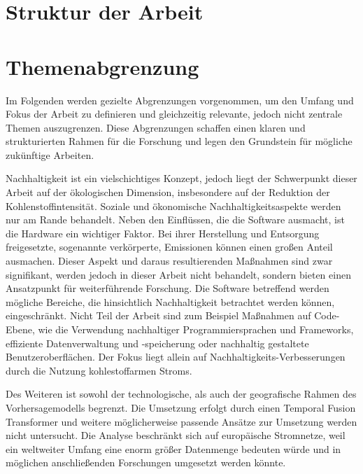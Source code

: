 \section{Struktur der Arbeit}
\section{Themenabgrenzung}
Im Folgenden werden gezielte Abgrenzungen vorgenommen, um den Umfang und Fokus der Arbeit zu definieren und gleichzeitig relevante, jedoch nicht zentrale Themen auszugrenzen.
Diese Abgrenzungen schaffen einen klaren und strukturierten Rahmen für die Forschung und legen den Grundstein für mögliche zukünftige Arbeiten.

Nachhaltigkeit ist ein vielschichtiges Konzept, jedoch liegt der Schwerpunkt dieser Arbeit auf der ökologischen Dimension, insbesondere auf der Reduktion der Kohlenstoffintensität.
Soziale und ökonomische Nachhaltigkeitsaspekte werden nur am Rande behandelt.
Neben den Einflüssen, die die Software ausmacht, ist die Hardware ein wichtiger Faktor.
Bei ihrer Herstellung und Entsorgung freigesetzte, sogenannte verkörperte, Emissionen können einen großen Anteil ausmachen.
Dieser Aspekt und daraus resultierenden Maßnahmen sind zwar signifikant, werden jedoch in dieser Arbeit nicht behandelt, sondern bieten einen Ansatzpunkt für weiterführende Forschung.
Die Software betreffend werden mögliche Bereiche, die hinsichtlich Nachhaltigkeit betrachtet werden können, eingeschränkt.
Nicht Teil der Arbeit sind zum Beispiel Maßnahmen auf Code-Ebene, wie die Verwendung nachhaltiger Programmiersprachen und Frameworks, effiziente Datenverwaltung und -speicherung oder nachhaltig gestaltete Benutzeroberflächen.
Der Fokus liegt allein auf Nachhaltigkeits-Verbesserungen durch die Nutzung kohlestoffarmen Stroms.


Des Weiteren ist sowohl der technologische, als auch der geografische Rahmen des Vorhersagemodells begrenzt.
Die Umsetzung erfolgt durch einen Temporal Fusion Transformer und weitere möglicherweise passende Ansätze zur Umsetzung werden nicht untersucht.
Die Analyse beschränkt sich auf europäische Stromnetze, weil ein weltweiter Umfang eine enorm größer Datenmenge bedeuten würde und in möglichen anschließenden Forschungen umgesetzt werden könnte.

